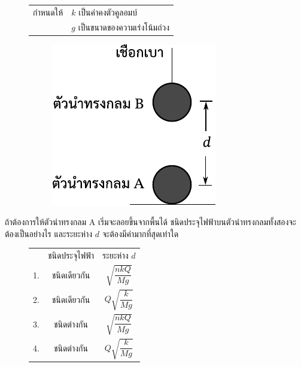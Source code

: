 \documentclass[a4paper, 12pt]{article}
\begin{document}
\begin{enumerate}
\begin{figure}[H]
\begin{minipage}[ht]{0.45\linewidth}
                  \begin{tabular}{rl}
                      กำหนดให้ & \(k\) เป็นค่าคงตัวคูลอมบ์          \\
                             & \(g\) เป็นขนาดของความเร่งโน้มถ่วง \\
                  \end{tabular}
              \end{minipage}
              \begin{minipage}[ht]{0.5\linewidth}
                  \begin{figure}[H]
                      \raggedleft
                      \includegraphics{images/8_17.pdf}
                  \end{figure}
              \end{minipage}
          \end{figure}
          ถ้าต้องการให้ตัวนำทรงกลม A เริ่มจะลอยขึ้นจากพื้นได้ ชนิดประจุไฟฟ้าบนตัวนำทรงกลมทั้งสองจะต้องเป็นอย่างไร และระยะห่าง \(d\) จะต้องมีค่ามากที่สุดเท่าใด
          \begin{figure}[H]
              \centering
              \begin{tabular}{c|c|c|}
                  \cline{2-3}
                     & ชนิดประจุไฟฟ้า & ระยะห่าง \(d\)              \\
                  \cline{2-3}
                  1. & ชนิดเดียวกัน   & \(\sqrt{\dfrac{nkQ}{Mg}}\) \\
                  \cline{2-3}
                  2. & ชนิดเดียวกัน   & \(Q\sqrt{\dfrac{k}{Mg}}\)  \\
                  \cline{2-3}
                  3. & ชนิดต่างกัน    & \(\sqrt{\dfrac{nkQ}{Mg}}\) \\
                  \cline{2-3}
                  4. & ชนิดต่างกัน    & \(Q\sqrt{\dfrac{k}{Mg}}\)  \\

\end{tabular}
\end{figure}
\end{enumerate}
\end{document}
